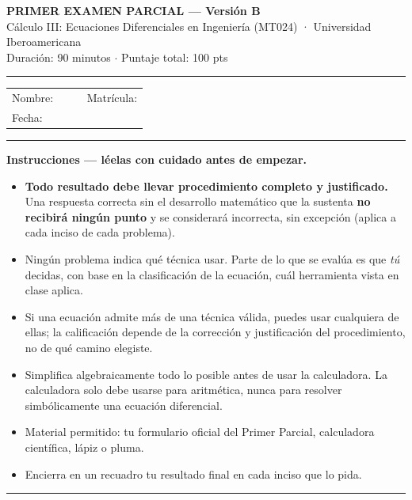 \documentclass[11pt,letterpaper]{article}
\newenvironment{aviso}{%
  \par\vspace{2pt}\hrule\vspace{6pt}
}{%
  \par\vspace{6pt}\hrule\vspace{2pt}
}
\begin{document}
\begin{center}
{\Large\bfseries PRIMER EXAMEN PARCIAL --- Versión B}\\[2pt]
{\small Cálculo III: Ecuaciones Diferenciales en Ingeniería (MT024) · Universidad Iberoamericana}\\[1pt]
{\small Duración: 90 minutos \; $\cdot$ \; Puntaje total: 100 pts}
\end{center}

\vspace{4pt}\hrule\vspace{10pt}

\noindent
\begin{tabular}{@{}p{0.55\linewidth}p{0.45\linewidth}@{}}
Nombre: \dotfill & Matrícula: \dotfill \\[10pt]
Fecha: \dotfill & \\[10pt]
\end{tabular}

\vspace{6pt}

\begin{aviso}
\textbf{Instrucciones — léelas con cuidado antes de empezar.}
\begin{itemize}[leftmargin=1.4em, itemsep=2pt, topsep=4pt]
  \item \textbf{Todo resultado debe llevar procedimiento completo y justificado.} Una respuesta correcta sin el desarrollo matemático que la sustenta \textbf{no recibirá ningún punto} y se considerará incorrecta, sin excepción (aplica a cada inciso de cada problema).
  \item Ningún problema indica qué técnica usar. Parte de lo que se evalúa es que \emph{tú} decidas, con base en la clasificación de la ecuación, cuál herramienta vista en clase aplica.
  \item Si una ecuación admite más de una técnica válida, puedes usar cualquiera de ellas; la calificación depende de la corrección y justificación del procedimiento, no de qué camino elegiste.
  \item Simplifica algebraicamente todo lo posible antes de usar la calculadora. La calculadora solo debe usarse para aritmética, nunca para resolver simbólicamente una ecuación diferencial.
  \item Material permitido: tu formulario oficial del Primer Parcial, calculadora científica, lápiz o pluma.
  \item Encierra en un recuadro tu resultado final en cada inciso que lo pida.
\end{itemize}
\end{aviso}
\end{document}

